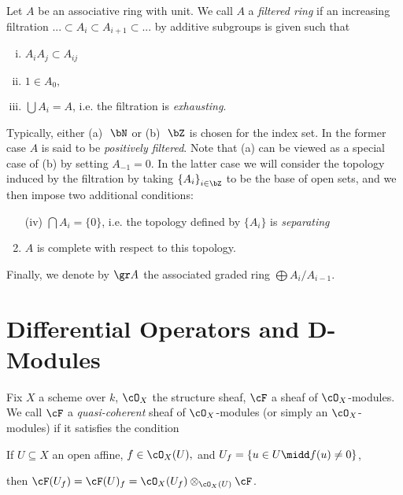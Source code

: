 \begin{defn}\label{defn:filtered-ring}
	Let $A$ be an associative ring with unit. We call $A$ a \emph{filtered ring} if an increasing filtration $... \subset A_i \subset A_{i+1} \subset ...$ by additive subgroups is given such that
	\begin{enumerate}[(i)]
		\item $A_iA_j \subset A_{ij}$
		\item $1 \in A_{0},$
		\item $\bigcup A_i = A$, i.e. the filtration is \emph{exhausting}.
	\end{enumerate}
	Typically, either (a) $~\bN$ or (b) $~\bZ$ is chosen for the index set. In the former case $A$ is said to be \emph{positively filtered}. Note that (a) can be viewed as a special case of (b) by setting $A_{-1} = 0$. In the latter case we will consider the topology induced by the filtration by taking $\left\{A_i\right\}_{i\in \bZ}$ to be the base of open sets, and we then impose two additional conditions:
	\begin{enumerate}
		\item[(iv)] $\bigcap A_i = \{0\}$, i.e. the topology defined by $\{A_i\}$ is \emph{separating}
		\item $A$ is complete with respect to this topology.
	\end{enumerate}

	\noindent Finally, we denote by $\gr A$ the associated graded ring $\bigoplus A_i / A_{i-1}$. 
\end{defn}

\newpage
\section{Differential Operators and D-Modules}
\begin{defn}\label{defn:quasi-coh-Bernstein}
	Fix $X$ a scheme over $k$, $\cO_X$ the structure sheaf, $\cF$ a sheaf of $\cO_X$-modules. We call $\cF$ a \textit{quasi-coherent} sheaf of $\cO_X$-modules (or simply an $\cO_X$-modules) if it satisfies the condition
	\begin{center}
		If $U\subseteq X$ an open affine, $f \in \cO_X(U),$ and $U_f = \left\{u \in U \midd f(u) \neq 0\right\}$,
	\end{center}
	then $\cF(U_f) = \cF(U)_f = \cO_X(U_f)\otimes_{\cO_X(U)} \cF$.
\end{defn}

